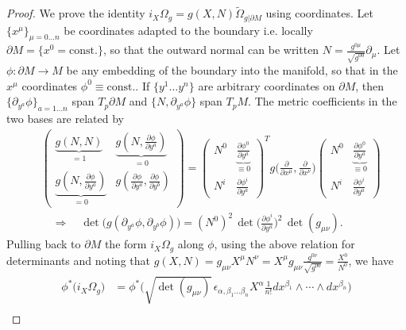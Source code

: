 \begin{proof}
We prove the identity $i_X \Omega_g = g(X,N) \tilde{\Omega}_{g|\partial M}$ using coordinates.
Let $\{x^\mu\}_{\mu=0\dots n}$ be coordinates adapted to the boundary i.e. locally $\partial M=\{x^0 = \text{const.}\}$, so that the outward normal can be written $N = \frac{g^{0\mu}}{\sqrt{g^{00}}} \partial_\mu$.
Let $\phi:\partial M \to M$ be any embedding of the boundary into the manifold, so that in the $x^\mu$ coordinates $\phi^0\equiv \text{const.}$.
If $\{y^1\dots y^n\}$ are arbitrary coordinates on $\partial M$, then $\{\partial_{y^a}\phi\}_{a=1\dots n}$ span $T_p \partial M$ and $\{N, \partial_{y^a}\phi\}$ span $T_p M$.
The metric coefficients in the two bases are related by
{\small
\begin{align}
    &\begin{pmatrix}
    \underbrace{g(N,N)}_{=1} & \underbrace{g(N, \tfrac{\partial \phi}{\partial y^a})}_{=0} \\
    \underbrace{g(N, \tfrac{\partial \phi}{\partial y^a})}_{=0} & g(\tfrac{\partial \phi}{\partial y^a}, \tfrac{\partial \phi}{\partial y^b})
    \end{pmatrix}
    = \begin{pmatrix}
    N^0 & \underbrace{\tfrac{\partial \phi^0}{\partial y^a}}_{\equiv 0}
    \\
    N^i & \tfrac{\partial \phi^i}{\partial y^a}
    \end{pmatrix}^T g\Big(\tfrac{\partial}{\partial x^\mu}, \tfrac{\partial}{\partial x^\nu}\Big)
    \begin{pmatrix}
    N^0 &  \underbrace{\tfrac{\partial \phi^0}{\partial y^a}}_{\equiv 0}
    \\
    N^i & \tfrac{\partial \phi^i}{\partial y^a}
    \end{pmatrix}\\[4pt]
    &\quad 
     \Rightarrow\quad \det \big(g(\partial_{y^a} \phi, \partial_{y^b} \phi)\big) = (N^0)^2\, \det\big(\tfrac{\partial \phi^i}{\partial y^a}\big)^2\, \det(g_{\mu \nu}).
\end{align}
}
Pulling back to $\partial M$ the form $i_X \Omega_g$ along $\phi$, using the above relation for determinants and noting that $g(X,N)= g_{\mu\nu}X^\mu N^\nu = X^\mu g_{\mu\nu} \tfrac{g^{0\nu}}{\sqrt{g^{00}}}= \tfrac{X^0}{N^0}$, we have
{\small
\begin{align}
    \phi^*\Big(i_X\Omega_g\Big) &= \phi^*\Big( \sqrt{\det(g_{\mu \nu})}\, \epsilon_{\alpha,\beta_1\dots\beta_n} X^\alpha \frac{1}{n!} dx^{\beta_1} \wedge \cdots \wedge dx^{\beta_n} \Big)\\

\end{align}}
\end{proof}
